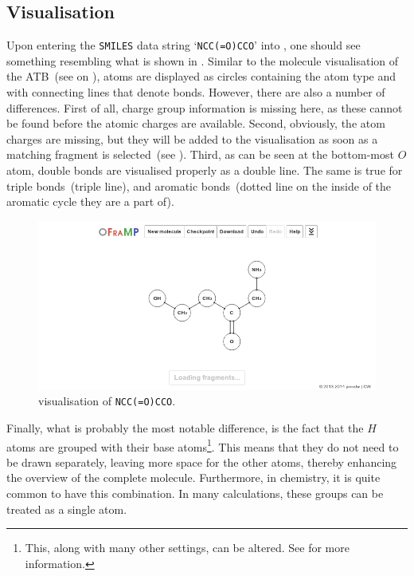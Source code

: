\subsection{Visualisation}
Upon entering the \verb|SMILES| data string `\verb|NCC(=O)CCO|' into \oframp, one should see something resembling what is shown in . Similar to the molecule visualisation of the ATB~(see  on ), atoms are displayed as circles containing the atom type and with connecting lines that denote bonds. However, there are also a number of differences. First of all, charge group information is missing here, as these cannot be found before the atomic charges are available. Second, obviously, the atom charges are missing, but they will be added to the visualisation as soon as a matching fragment is selected~(see ). Third, as can be seen at the bottom-most $O$ atom, double bonds are visualised properly as a double line. The same is true for triple bonds~(triple line), and aromatic bonds~(dotted line on the inside of the aromatic cycle they are a part of).

\begin{figure}
\center
\includegraphics[width=.9\textwidth]{img/impl_visualising.png}
\caption{\oframp{} visualisation of \texttt{NCC(=O)CCO}.}
\end{figure}

Finally, what is probably the most notable difference, is the fact that the $H$ atoms are grouped with their base atoms\footnote{This, along with many other settings, can be altered. See  for more information.}. This means that they do not need to be drawn separately, leaving more space for the other atoms, thereby enhancing the overview of the complete molecule. Furthermore, in chemistry, it is quite common to have this combination. In many calculations, these groups can be treated as a single atom.

